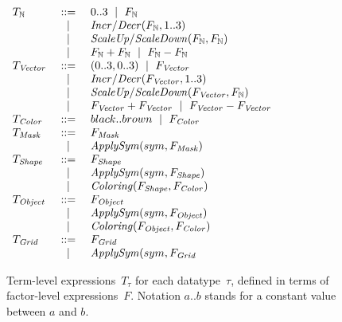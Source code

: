 \documentclass[a4paper]{llncs}
\newenvironment{datatype}{$\begin{array}{lcl}}{\end{array}$}
\newcommand{\is}{&\ ::=\ &}
\newcommand{\alter}{\ \mid\ }
\newcommand{\altis}{\\ &\ \mid\ &}
\newcommand{\nat}{\mathbb{N}}
\begin{document}
\begin{figure}[t!]
\begin{center}
  \begin{datatype}
    T_\nat \is 0..3 \alter F_\nat
    \altis {\it Incr/Decr}(F_\nat, 1..3)
    \altis {\it ScaleUp/ScaleDown}(F_\nat, F_\nat)
    \altis F_\nat + F_\nat \alter F_\nat - F_\nat
    \\
    T_{\it Vector} \is (0..3,0..3) \alter F_{\it Vector}
    \altis {\it Incr/Decr}(F_{\it Vector}, 1..3)
    \altis {\it ScaleUp/ScaleDown}(F_{\it Vector}, F_\nat)
    \altis F_{\it Vector} + F_{\it Vector} \alter F_{\it Vector} - F_{\it Vector}
    \\
    T_{\it Color} \is black..brown \alter F_{\it Color}
    \\
    T_{\it Mask} \is F_{\it Mask}
    \altis {\it ApplySym}(sym, F_{\it Mask})
    \\
    T_{\it Shape} \is F_{\it Shape}
    \altis {\it ApplySym}(sym, F_{\it Shape})
    \altis {\it Coloring}(F_{\it Shape}, F_{\it Color})
    \\
    T_{\it Object} \is F_{\it Object}
    \altis {\it ApplySym}(sym, F_{\it Object})
    \altis {\it Coloring}(F_{\it Object}, F_{\it Color})
    \\
    T_{\it Grid} \is F_{\it Grid}
    \altis {\it ApplySym}(sym, F_{\it Grid}
  \end{datatype}
\end{center}
\caption{Term-level expressions~$T_\tau$ for each datatype~$\tau$,
  defined in terms of factor-level expressions~$F$. Notation $a..b$
  stands for a constant value between $a$ and $b$.}
\label{fig:expressions2}
\end{figure}
\end{document}

